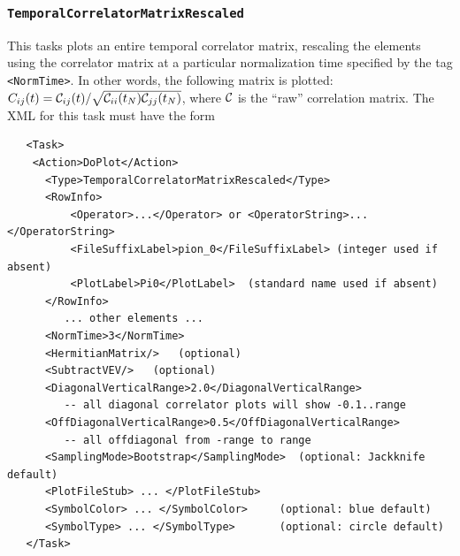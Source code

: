 \documentclass[12pt]{article}
\newcommand{\vb}{\texttt}
\begin{document}
\subsubsection{\vb{TemporalCorrelatorMatrixRescaled}}
This tasks plots an entire temporal correlator matrix, rescaling the 
elements using the correlator matrix at a particular normalization time
specified by the tag \vb{<NormTime>}.  In other words, the following
matrix is plotted: $C_{ij}(t)={\cal C}_{ij}(t)/\sqrt{{\cal C}_{ii}(t_N)
{\cal C}_{jj}(t_N)}$, where ${\cal C}$ is the ``raw'' correlation matrix.
The XML for this task must have the form
\begin{verbatim}
   <Task>                                                                   
    <Action>DoPlot</Action>                                                 
      <Type>TemporalCorrelatorMatrixRescaled</Type>                         
      <RowInfo>                                                             
          <Operator>...</Operator> or <OperatorString>...</OperatorString>  
          <FileSuffixLabel>pion_0</FileSuffixLabel> (integer used if absent)
          <PlotLabel>Pi0</PlotLabel>  (standard name used if absent)        
      </RowInfo>                                                            
         ... other elements ...                                             
      <NormTime>3</NormTime>                                                
      <HermitianMatrix/>   (optional)                                       
      <SubtractVEV/>   (optional)                                           
      <DiagonalVerticalRange>2.0</DiagonalVerticalRange>                    
         -- all diagonal correlator plots will show -0.1..range             
      <OffDiagonalVerticalRange>0.5</OffDiagonalVerticalRange>              
         -- all offdiagonal from -range to range                            
      <SamplingMode>Bootstrap</SamplingMode>  (optional: Jackknife default) 
      <PlotFileStub> ... </PlotFileStub>                                    
      <SymbolColor> ... </SymbolColor>     (optional: blue default)         
      <SymbolType> ... </SymbolType>       (optional: circle default)       
   </Task>                                                                  
\end{verbatim}
%
\end{document}
